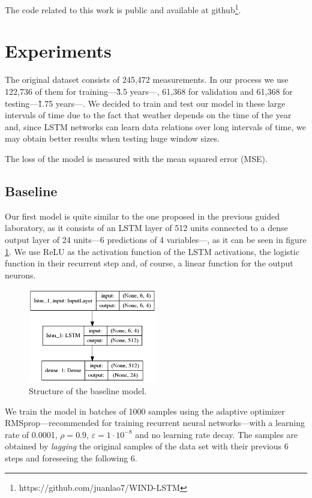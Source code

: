 \documentclass[]{article}
\begin{document}
The code related to this work is public and available at github\footnote{https://github.com/juanlao7/WIND-LSTM}.

\section{Experiments}

The original dataset consists of 245,472 measurements. In our process we use 122,736 of them for training---\~3.5 years---, 61,368 for validation and 61,368 for testing---\~1.75 years---. We decided to train and test our model in these large intervals of time due to the fact that weather depends on the time of the year and, since LSTM networks can learn data relations over long intervals of time, we may obtain better results when testing huge window sizes.

The loss of the model is measured with the mean squared error (MSE).

\subsection{Baseline}

Our first model is quite similar to the one proposed in the previous guided laboratory, as it consists of an LSTM layer of 512 units connected to a dense output layer of 24 units---6 predictions of 4 variables---, as it can be seen in figure \ref{f:model}. We use ReLU as the activation function of the LSTM activations, the logistic function in their recurrent step and, of course, a linear function for the output neurons.

\begin{figure}[H]
	\centering
	\includegraphics[width=0.5\textwidth]{model}
	\caption{Structure of the baseline model.}
	\label{f:model}
\end{figure}


We train the model in batches of 1000 samples using the adaptive optimizer RMSprop---recommended for training recurrent neural networks---with a learning rate of 0.0001, $ \rho = 0.9 $, $ \varepsilon = 1 \cdot 10^{-8} $ and no learning rate decay. The samples are obtained by \emph{lagging} the original samples of the data set with their previous 6 steps and foreseeing the following 6.
\end{document}
